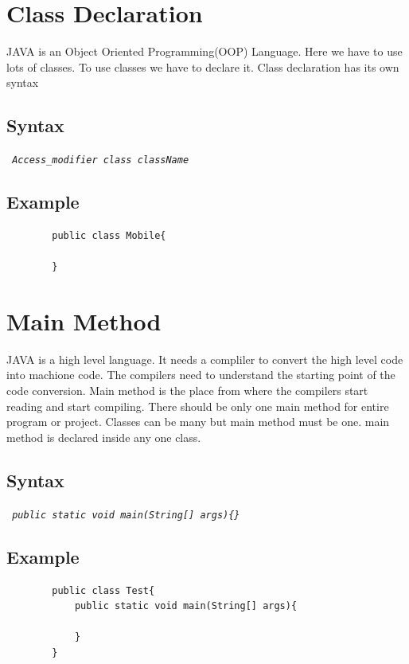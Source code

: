 \documentclass[A4 paper,openany]{book}  %
\begin{document}
\section{Class Declaration}
JAVA is an Object Oriented Programming(OOP) Language. Here we have to use lots of classes. To use classes we have to declare it. Class declaration has its own syntax
% 
% 
\subsection{Syntax}
\begin{center}
    \tt{
        \textit{Access\_modifier class className}
    }
\end{center}
% 
% 
\subsection{Example}
\begin{center}
    \begin{verbatim}
        public class Mobile{

        }
    \end{verbatim}
\end{center}

% 
% 
\section{Main Method}
JAVA is a high level language. It needs a compliler to convert the high level code into machione code. The compilers need to understand the starting point of the code conversion.
Main method is the place from where the compilers start reading and start compiling. There should be only one main method for entire program or project. Classes can be many but main method
must be one. main method is declared inside any one class.
% 
% 
\subsection{Syntax}
\begin{center}
    \tt{
        \textit{public static void main(String[] args)\{\}}
    }
\end{center}
% 
% 
\subsection{Example}
\begin{center}
    \begin{verbatim}
        public class Test{
            public static void main(String[] args){

            }
        }
    \end{verbatim}
\end{center}
\end{document}
